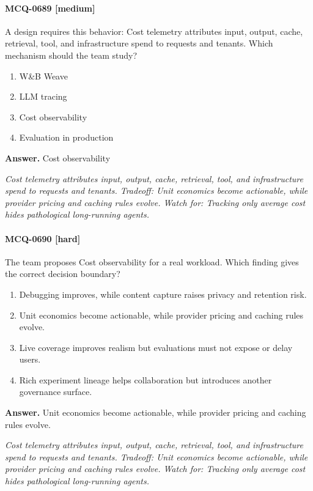 \paragraph{MCQ-0689 [medium]} A design requires this behavior: Cost telemetry attributes input, output, cache, retrieval, tool, and infrastructure spend to requests and tenants. Which mechanism should the team study?
\begin{enumerate}[label=\Alph*.]
\item W\&B Weave
\item LLM tracing
\item Cost observability
\item Evaluation in production
\end{enumerate}
\noindent\textbf{Answer.} Cost observability
\par\textit{Cost telemetry attributes input, output, cache, retrieval, tool, and infrastructure spend to requests and tenants. Tradeoff: Unit economics become actionable, while provider pricing and caching rules evolve. Watch for: Tracking only average cost hides pathological long-running agents.}
\paragraph{MCQ-0690 [hard]} The team proposes Cost observability for a real workload. Which finding gives the correct decision boundary?
\begin{enumerate}[label=\Alph*.]
\item Debugging improves, while content capture raises privacy and retention risk.
\item Unit economics become actionable, while provider pricing and caching rules evolve.
\item Live coverage improves realism but evaluations must not expose or delay users.
\item Rich experiment lineage helps collaboration but introduces another governance surface.
\end{enumerate}
\noindent\textbf{Answer.} Unit economics become actionable, while provider pricing and caching rules evolve.
\par\textit{Cost telemetry attributes input, output, cache, retrieval, tool, and infrastructure spend to requests and tenants. Tradeoff: Unit economics become actionable, while provider pricing and caching rules evolve. Watch for: Tracking only average cost hides pathological long-running agents.}
